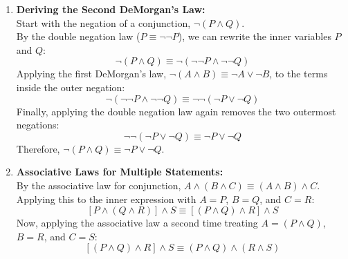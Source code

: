 \begin{enumerate}
\begin{enumerate}
  \item $(P \land R) \lor [\neg R \land (P \lor Q)]$ \\
    \begin{align*}
      (P \land R) \lor [\neg R \land (P \lor Q) &\equiv (P \land R) \lor [(\neg R \land P) \lor (\neg R \land Q)] \quad \text{distributive law} \\
        &\equiv [(P \land R) \lor (\neg R \land P)] \lor (\neg R \land Q) \quad \text{associative law} \\
        &\equiv [(R \land P) \lor (\neg R \land P)] \lor (\neg R \land Q) \quad \text{commutative law} \\
        &\equiv [(R \lor \neg R) \land P] \lor (\neg R \land Q) \quad \text{distributive law} \\
        &\equiv [True \land P] \lor (\neg R \land Q) \quad \text{tautology law} \\
        &\equiv P \lor (\neg R \land Q) \quad \text{identity law}
    \end{align*}
  \end{enumerate}

  \item \textbf{Deriving the Second DeMorgan's Law:} \\
  Start with the negation of a conjunction, $\neg(P \land Q)$. \\
  By the double negation law ($P \equiv \neg\neg P$), we can rewrite the inner variables $P$ and $Q$:
  \[ \neg(P \land Q) \equiv \neg(\neg\neg P \land \neg\neg Q) \]
  Applying the first DeMorgan's law, $\neg(A \land B) \equiv \neg A \lor \neg B$, to the terms inside the outer negation:
  \[ \neg(\neg\neg P \land \neg\neg Q) \equiv \neg\neg(\neg P \lor \neg Q) \]
  Finally, applying the double negation law again removes the two outermost negations:
  \[ \neg\neg(\neg P \lor \neg Q) \equiv \neg P \lor \neg Q \]
  Therefore, $\neg(P \land Q) \equiv \neg P \lor \neg Q$.

  \item \textbf{Associative Laws for Multiple Statements:} \\
  By the associative law for conjunction, $A \land (B \land C) \equiv (A \land B) \land C$. \\
  Applying this to the inner expression with $A=P$, $B=Q$, and $C=R$:
  \[ [P \land (Q \land R)] \land S \equiv [(P \land Q) \land R] \land S \]
  Now, applying the associative law a second time treating $A=(P \land Q)$, $B=R$, and $C=S$:
  \[ [(P \land Q) \land R] \land S \equiv (P \land Q) \land (R \land S) \]


\end{enumerate}
